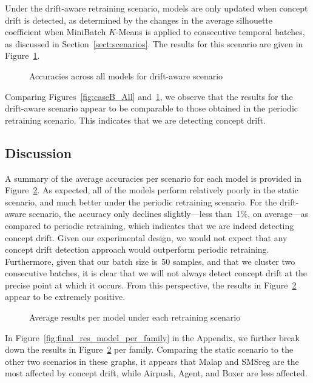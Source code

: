 \documentclass[12pt]{article}
\begin{document}
Under the drift-aware retraining scenario, 
models are only updated when concept drift is detected,
as determined by the changes in the average silhouette coefficient
when MiniBatch $K$-Means is applied to consecutive temporal batches,
as discussed in Section~\ref{sect:scenarios}.
The results for this scenario are given in Figure~\ref{fig:caseC_All}.

\begin{figure}[!htb]
    \centering
    
    \caption{Accuracies across all models for drift-aware scenario}\label{fig:caseC_All}
\end{figure}

Comparing Figures~\ref{fig:caseB_All} and~\ref{fig:caseC_All}, we observe
that the results for the drift-aware scenario appear to be comparable to those
obtained in the periodic retraining scenario. This indicates that we 
are detecting concept drift.

\subsection{Discussion}\label{sect:disc}

A summary of the average accuracies per scenario for each model is provided in Figure~\ref{fig:final_res_model}. As expected, all of
the models perform relatively poorly in the static scenario,
and much better under the periodic retraining scenario.
For the drift-aware scenario, the accuracy only declines 
slightly---less than~1\%, on average---as compared to periodic retraining, 
which indicates that we are indeed detecting concept drift. 
Given our experimental design, we would not expect that any concept drift 
detection approach would outperform periodic retraining. Furthermore,
given that our batch size is~50 samples, and that we cluster two consecutive
batches, it is clear that we will not always detect concept drift at the precise 
point at which it occurs. From this perspective, the results in 
Figure~\ref{fig:final_res_model} appear to be extremely positive.

\begin{figure}[!htb]
    \centering
    
    \caption{Average results per model under each retraining scenario}
    \label{fig:final_res_model}
\end{figure}

In Figure~\ref{fig:final_res_model_per_family} in the Appendix, we further
break down the results in Figure~\ref{fig:final_res_model} per family.
Comparing the static scenario to the other two scenarios in these graphs,
it appears that Malap and SMSreg are the most affected by
concept drift, while Airpush, Agent, and Boxer are less affected.
\end{document}
